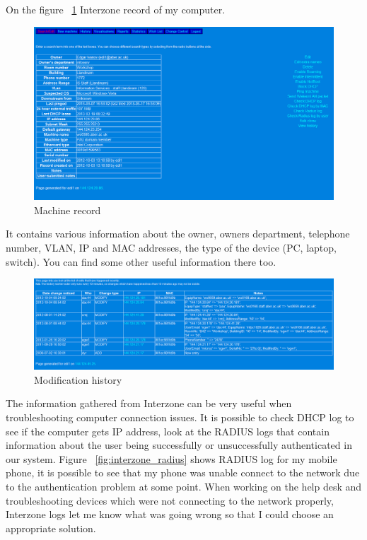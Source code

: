 \documentclass[10pt,a4paper,headinclude=true,twoside]{report}
\begin{document}
On the figure ~\ref{fig:machine_record} Interzone record of my computer.

\begin{figure}[H]
\centering
\centerline{\includegraphics[scale=0.5]{./machine_record}}
\caption{Machine record}
\label{fig:machine_record}
\end{figure}

It contains various information about the owner, owners department, telephone number, VLAN, IP and MAC addresses, the type of the device (PC, laptop, switch). You can find some other useful information there too.

\begin{figure}[H]
\centering
\centerline{\includegraphics[scale=0.5]{./modification_history}}
\caption{Modification history}
\label{fig:modification_history}
\end{figure}

The information gathered from Interzone can be very useful when troubleshooting computer connection issues. It is possible to check DHCP log to see if the computer gets IP address, look at the RADIUS logs that contain information about the user being successfully or unsuccessfully authenticated in our system. Figure ~\ref{fig:interzone_radius} shows RADIUS log for my mobile phone, it is possible to see that my phone was unable connect to the network due to the authentication problem at some point. When working on the help desk and troubleshooting devices which were not connecting to the network properly, Interzone logs let me know what was going wrong so that I could choose an appropriate solution. 
\end{document}

